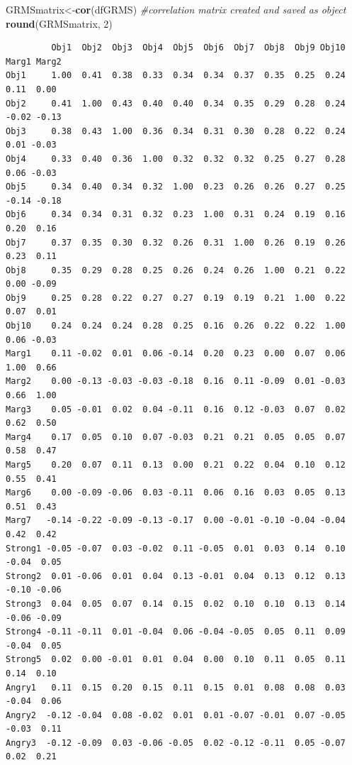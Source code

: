 \documentclass[
  english,
]{book}
\newenvironment{Shaded}{\begin{snugshade}}{\end{snugshade}}
\newcommand{\CommentTok}[1]{\textcolor[rgb]{0.56,0.35,0.01}{\textit{#1}}}
\newcommand{\DecValTok}[1]{\textcolor[rgb]{0.00,0.00,0.81}{#1}}
\newcommand{\KeywordTok}[1]{\textcolor[rgb]{0.13,0.29,0.53}{\textbf{#1}}}
\newcommand{\NormalTok}[1]{#1}
\begin{document}
\begin{Shaded}
\begin{Highlighting}[]
\NormalTok{GRMSmatrix<-}\KeywordTok{cor}\NormalTok{(dfGRMS) }\CommentTok{#correlation matrix created and saved as object}
\KeywordTok{round}\NormalTok{(GRMSmatrix, }\DecValTok{2}\NormalTok{)}
\end{Highlighting}
\end{Shaded}

\begin{verbatim}
         Obj1  Obj2  Obj3  Obj4  Obj5  Obj6  Obj7  Obj8  Obj9 Obj10 Marg1 Marg2
Obj1     1.00  0.41  0.38  0.33  0.34  0.34  0.37  0.35  0.25  0.24  0.11  0.00
Obj2     0.41  1.00  0.43  0.40  0.40  0.34  0.35  0.29  0.28  0.24 -0.02 -0.13
Obj3     0.38  0.43  1.00  0.36  0.34  0.31  0.30  0.28  0.22  0.24  0.01 -0.03
Obj4     0.33  0.40  0.36  1.00  0.32  0.32  0.32  0.25  0.27  0.28  0.06 -0.03
Obj5     0.34  0.40  0.34  0.32  1.00  0.23  0.26  0.26  0.27  0.25 -0.14 -0.18
Obj6     0.34  0.34  0.31  0.32  0.23  1.00  0.31  0.24  0.19  0.16  0.20  0.16
Obj7     0.37  0.35  0.30  0.32  0.26  0.31  1.00  0.26  0.19  0.26  0.23  0.11
Obj8     0.35  0.29  0.28  0.25  0.26  0.24  0.26  1.00  0.21  0.22  0.00 -0.09
Obj9     0.25  0.28  0.22  0.27  0.27  0.19  0.19  0.21  1.00  0.22  0.07  0.01
Obj10    0.24  0.24  0.24  0.28  0.25  0.16  0.26  0.22  0.22  1.00  0.06 -0.03
Marg1    0.11 -0.02  0.01  0.06 -0.14  0.20  0.23  0.00  0.07  0.06  1.00  0.66
Marg2    0.00 -0.13 -0.03 -0.03 -0.18  0.16  0.11 -0.09  0.01 -0.03  0.66  1.00
Marg3    0.05 -0.01  0.02  0.04 -0.11  0.16  0.12 -0.03  0.07  0.02  0.62  0.50
Marg4    0.17  0.05  0.10  0.07 -0.03  0.21  0.21  0.05  0.05  0.07  0.58  0.47
Marg5    0.20  0.07  0.11  0.13  0.00  0.21  0.22  0.04  0.10  0.12  0.55  0.41
Marg6    0.00 -0.09 -0.06  0.03 -0.11  0.06  0.16  0.03  0.05  0.13  0.51  0.43
Marg7   -0.14 -0.22 -0.09 -0.13 -0.17  0.00 -0.01 -0.10 -0.04 -0.04  0.42  0.42
Strong1 -0.05 -0.07  0.03 -0.02  0.11 -0.05  0.01  0.03  0.14  0.10 -0.04  0.05
Strong2  0.01 -0.06  0.01  0.04  0.13 -0.01  0.04  0.13  0.12  0.13 -0.10 -0.06
Strong3  0.04  0.05  0.07  0.14  0.15  0.02  0.10  0.10  0.13  0.14 -0.06 -0.09
Strong4 -0.11 -0.11  0.01 -0.04  0.06 -0.04 -0.05  0.05  0.11  0.09 -0.04  0.05
Strong5  0.02  0.00 -0.01  0.01  0.04  0.00  0.10  0.11  0.05  0.11  0.14  0.10
Angry1   0.11  0.15  0.20  0.15  0.11  0.15  0.01  0.08  0.08  0.03 -0.04  0.06
Angry2  -0.12 -0.04  0.08 -0.02  0.01  0.01 -0.07 -0.01  0.07 -0.05 -0.03  0.11
Angry3  -0.12 -0.09  0.03 -0.06 -0.05  0.02 -0.12 -0.11  0.05 -0.07  0.02  0.21

\end{verbatim}
\end{document}
